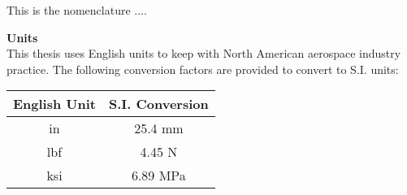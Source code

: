 This is the nomenclature ....

\begin{center}
{\Large\bf Units}\\
This thesis uses English units to keep with North American
aerospace industry practice.  The following conversion factors are
provided to convert to S.I. units:\\ \vspace{12pt}
\begin{tabular}{cc}
  \hline
  English Unit & S.I. Conversion \\
  \hline\hline
  in & 25.4 mm \\
  lbf & 4.45 N \\
  ksi & 6.89 MPa \\
  \hline
\end{tabular}
\end{center}
